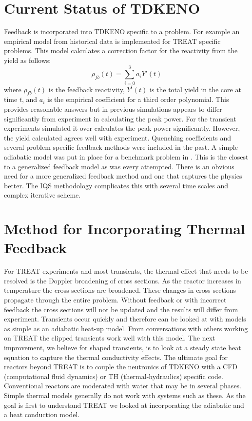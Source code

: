 \documentclass[11pt]{article}
\begin{document}
\section{Current Status of TDKENO}
Feedback is incorporated into TDKENO specific to a problem.  For example an empirical model from historical data is implemented for TREAT specific problems. This model calculates a correction factor for the reactivity from the yield as follows:
\begin{equation}
    \rho_{fb}(t) = \sum_{i = 0}^{3}a_i Y^i (t)
\end{equation}
where $\rho_{fb}(t)$ is the feedback reactivity, $Y^i (t)$ is the total yield in the core at time $t$, and $a_i$ is the empirical coefficient for a third order polynomial.
  This provides reasonable answers but in previous simulations appears to differ significantly from experiment in calculating the peak power.  For the transient experiments simulated it over calculates the peak power significantly. However, the yield calculated agrees well with experiment.
Quenching coefficients and several problem specific feedback methods were included in the past.  A simple adiabatic model was put in place for a benchmark problem in \cite{Bentley}.  This is the closest to a generalized feedback model as was every attempted.  There is an obvious need for a more generalized feedback method and one that captures the physics better.  The IQS methodology complicates this with several time scales and complex iterative scheme.  

\section{Method for Incorporating Thermal Feedback}

For TREAT experiments and most transients, the thermal effect that needs to be resolved is the Doppler broadening of cross sections.  As the reactor increases in temperature the cross sections are broadened.  These changes in cross sections propagate through the entire problem.  Without feedback or with incorrect feedback the cross sections will not be updated and the results will differ from experiment.  Transients occur quickly and therefore can be looked at with models as simple as an adiabatic heat-up model.  From conversations with others working on TREAT the clipped transients work well with this model.  The next improvement, we believe for shaped transients, is to look at a steady state heat equation to capture the thermal conductivity effects.  The ultimate goal for reactors beyond TREAT is to couple the neutronics of TDKENO with a CFD (computational fluid dynamics) or TH (thermal-hydraulics) specific code.  Conventional reactors are moderated with water that may be in several phases.  Simple thermal models generally do not work with systems such as these.  As the goal is first to understand TREAT we looked at incorporating the adiabatic and a heat conduction model.
\end{document}
